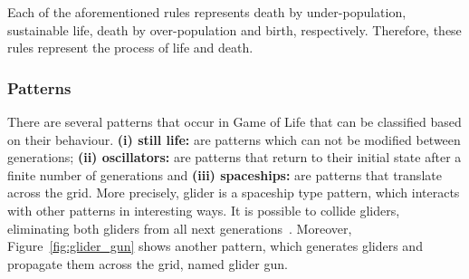 \documentclass[12pt]{article}
\begin{document}


Each of the aforementioned rules represents death by under-population, sustainable life, death by over-population and birth, respectively. Therefore, these rules represent the process of life and death.


\subsubsection{Patterns}

There are several patterns that occur in Game of Life that can be classified based on their behaviour. \textbf{(i) still life:} are patterns which can not be modified between generations; \textbf{(ii) oscillators:} are patterns that return to their initial state after a finite number of generations and \textbf{(iii) spaceships:} are patterns that translate across the grid. More precisely, glider is a spaceship type pattern, which interacts with other patterns in interesting ways. It is possible to collide gliders, eliminating both gliders from all next generations~\cite{Adamatzky:book:2012}. Moreover, Figure~\ref{fig:glider_gun} shows another pattern, which generates gliders and propagate them across the grid, named glider gun.
\end{document}
